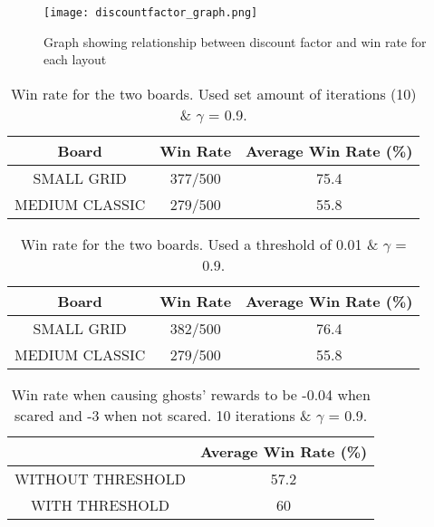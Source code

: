 \documentclass[12pt]{report}
\begin{document}
      \begin{figure}[H]
        \centering
        \texttt{[image: discountfactor\_graph.png]}
        \caption{Graph showing relationship between discount factor and win rate for each layout}
      \end{figure}

        \begin{table}[h!]
          \begin{center}
            \begin{tabular}{c|c|c}
              \textbf{Board} & \textbf{Win Rate} & \textbf{Average Win Rate (\%)} \\
              \hline
              SMALL GRID & 377/500 & 75.4\\
              MEDIUM CLASSIC & 279/500 & 55.8\\
            \end{tabular}
            \caption{Win rate for the two boards. Used set amount of iterations (10) \& $\gamma$ = 0.9.}
            \label{tab:table2}
          \end{center}
        \end{table}

        \begin{table}[h!]
          \begin{center}
            \begin{tabular}{c|c|c}
              \textbf{Board} & \textbf{Win Rate} & \textbf{Average Win Rate (\%)} \\
              \hline
              SMALL GRID & 382/500 & 76.4\\
              MEDIUM CLASSIC & 279/500 & 55.8\\
            \end{tabular}
            \caption{Win rate for the two boards. Used a threshold of 0.01 \& $\gamma$ = 0.9.}
            \label{tab:table3}
          \end{center}
        \end{table}

        \begin{table}[h!]
          \begin{center}
            \begin{tabular}{c|c}
              \textbf{} & \textbf{Average Win Rate (\%)} \\
              \hline
              WITHOUT THRESHOLD & 57.2\\
              WITH THRESHOLD & 60\\
            \end{tabular}
            \caption{Win rate when causing ghosts' rewards to be -0.04 when scared and -3 when not scared. 10 iterations \& $\gamma$ = 0.9.}
            \label{tab:table4}
          \end{center}
        \end{table}
\end{document}
